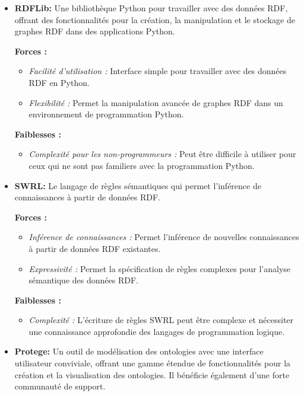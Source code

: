 \begin{itemize}
	\item \textbf{RDFLib:} Une bibliothèque Python pour travailler avec des données RDF, offrant des fonctionnalités pour la création, la manipulation et le stockage de graphes RDF dans des applications Python.
	
	\textbf{Forces :}
	\begin{itemize}
		\item \textit{Facilité d'utilisation :} Interface simple pour travailler avec des données RDF en Python.
		\item \textit{Flexibilité :} Permet la manipulation avancée de graphes RDF dans un environnement de programmation Python.
	\end{itemize}
	
	\textbf{Faiblesses :}
	\begin{itemize}
		\item \textit{Complexité pour les non-programmeurs :} Peut être difficile à utiliser pour ceux qui ne sont pas familiers avec la programmation Python.
	\end{itemize}
	
	\item \textbf{SWRL:} Le langage de règles sémantiques qui permet l'inférence de connaissances à partir de données RDF.
	
	\textbf{Forces :}
	\begin{itemize}
		\item \textit{Inférence de connaissances :} Permet l'inférence de nouvelles connaissances à partir de données RDF existantes.
		\item \textit{Expressivité :} Permet la spécification de règles complexes pour l'analyse sémantique des données RDF.
	\end{itemize}
	
	\textbf{Faiblesses :}
	\begin{itemize}
		\item \textit{Complexité :} L'écriture de règles SWRL peut être complexe et nécessiter une connaissance approfondie des langages de programmation logique.
	\end{itemize}
	
	\item \textbf{Protege:} Un outil de modélisation des ontologies avec une interface utilisateur conviviale, offrant une gamme étendue de fonctionnalités pour la création et la visualisation des ontologies. Il bénéficie également d'une forte communauté de support.
	

\end{itemize}
